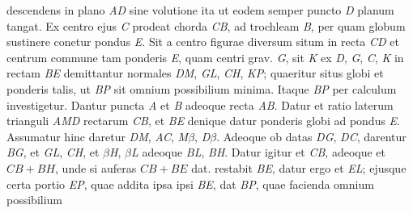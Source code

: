 descendens in plano \textit{AD} sine volutione ita ut eodem semper puncto \textit{D} planum tangat. Ex centro ejus \textit{C} prodeat chorda \textit{CB}, ad trochleam \textit{B}, per quam globum sustinere conetur pondus \textit{E}. Sit 
a centro figurae diversum situm in recta \textit{CD} et centrum commune
tam ponderis \textit{E}, quam centri grav. \textit{G}, sit \textit{K}\bracks{;}
ex \textit{D}, \textit{G}, \textit{C}, \textit{K} in rectam \textit{BE} demittantur normales \textit{DM}, \textit{GL},
\textit{CH}, \textit{KP}; quaeritur situs globi et ponderis talis, ut \textit{BP} sit omnium possibilium 
minima.
\pend
\pstart
Itaque \textit{BP} per calculum investigetur. Dantur puncta \textit{A} et \textit{B} adeoque recta \textit{AB}. Datur et ratio laterum trianguli \textit{AMD} 
rectarum \textit{CB}, et \textit{BE}\bracks{,} denique datur
ponderis globi ad pondus \textit{E}. Assumatur 
hinc daretur \textit{DM}, \textit{AC}, \textit{M$\beta$}, \textit{D$\beta$}. Adeoque ob datas \textit{DG}, \textit{DC}, darentur \textit{BG}, 
et \textit{GL}, \textit{CH}, et \textit{$\beta$H}, \textit{$\beta$L} adeoque \textit{BL}, \textit{BH}. Datur igitur et \textit{CB}, adeoque et $CB+BH$, unde si auferas $CB+BE$ dat. restabit \textit{BE}, datur ergo et \textit{EL}; ejusque certa portio \textit{EP}, quae addita ipsa ipsi \textit{BE}, dat \textit{BP}, quae facienda omnium possibilium 
